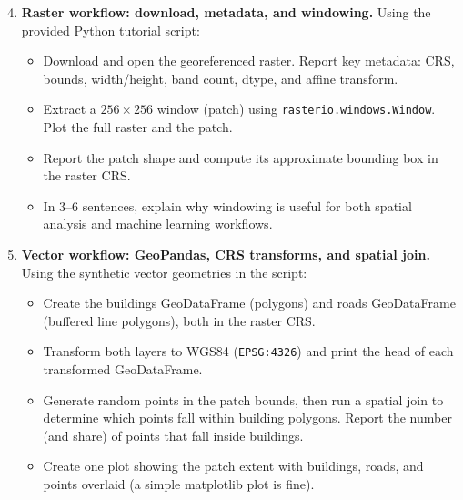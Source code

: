 \documentclass[11pt]{article}
\begin{document}
  \begin{enumerate}
\setcounter{enumi}{3}

\item \textbf{Raster workflow: download, metadata, and windowing.}
Using the provided Python tutorial script:
\begin{itemize}
  \item Download and open the georeferenced raster. Report key metadata: CRS, bounds, width/height, band count, dtype, and affine transform.
  \item Extract a $256 \times 256$ window (patch) using \texttt{rasterio.windows.Window}. Plot the full raster and the patch.
  \item Report the patch shape and compute its approximate bounding box in the raster CRS.
  \item In 3--6 sentences, explain why windowing is useful for both spatial analysis and machine learning workflows.
\end{itemize}

\item \textbf{Vector workflow: GeoPandas, CRS transforms, and spatial join.}
Using the synthetic vector geometries in the script:
\begin{itemize}
  \item Create the buildings GeoDataFrame (polygons) and roads GeoDataFrame (buffered line polygons), both in the raster CRS.
  \item Transform both layers to WGS84 (\texttt{EPSG:4326}) and print the head of each transformed GeoDataFrame.
  \item Generate random points in the patch bounds, then run a spatial join to determine which points fall within building polygons. Report the number (and share) of points that fall inside buildings.
  \item Create one plot showing the patch extent with buildings, roads, and points overlaid (a simple matplotlib plot is fine).
\end{itemize}


\end{enumerate}
\end{document}

